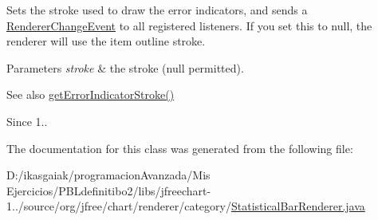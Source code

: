 Sets the stroke used to draw the error indicators, and sends a \mbox{\hyperlink{}{Renderer\+Change\+Event}} to all registered listeners. If you set this to {\ttfamily null}, the renderer will use the item outline stroke.


\begin{DoxyParams}{Parameters}
{\em stroke} & the stroke ({\ttfamily null} permitted).\\
\hline
\end{DoxyParams}
\begin{DoxySeeAlso}{See also}
\mbox{\hyperlink{classorg_1_1jfree_1_1chart_1_1renderer_1_1category_1_1_statistical_bar_renderer_a12a547abd30256cc05729bd86bcb7084}{get\+Error\+Indicator\+Stroke()}}
\end{DoxySeeAlso}
\begin{DoxySince}{Since}
1.. 
\end{DoxySince}


The documentation for this class was generated from the following file\+:\begin{DoxyCompactItemize}
\item 
D\+:/ikasgaiak/programacion\+Avanzada/\+Mis Ejercicios/\+P\+B\+Ldefinitibo2/libs/jfreechart-\/1../source/org/jfree/chart/renderer/category/\mbox{\hyperlink{_statistical_bar_renderer_8java}{Statistical\+Bar\+Renderer.\+java}}\end{DoxyCompactItemize}
